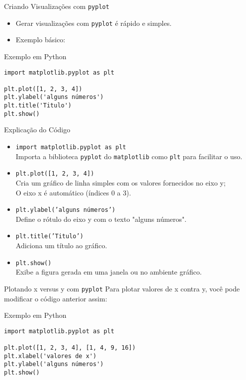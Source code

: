 \begin{frame}[fragile]{Criando Visualizações com \texttt{pyplot}}
    \begin{itemize}
        \item Gerar visualizações com \texttt{pyplot} é rápido e simples.
        \item Exemplo básico:
    \end{itemize}

    \begin{block}{Exemplo em Python}
        \begin{verbatim}
import matplotlib.pyplot as plt

plt.plot([1, 2, 3, 4])
plt.ylabel('alguns números')
plt.title('Titulo')
plt.show()
    \end{verbatim}
    \end{block}
\end{frame}

\begin{frame}{Explicação do Código}
    \begin{itemize}
        \item \texttt{import matplotlib.pyplot as plt} \\
              Importa a biblioteca \texttt{pyplot} do \texttt{matplotlib}  como \texttt{plt} para facilitar o uso.
        \item \texttt{plt.plot([1, 2, 3, 4])} \\
              Cria um gráfico de linha simples com os valores fornecidos no eixo y;\\ O eixo x é automático (índices 0 a 3).
        \item \texttt{plt.ylabel('alguns números')} \\
              Define o rótulo do eixo y com o texto "alguns números".
        \item \texttt{plt.title('Titulo')} \\
              Adiciona um título ao gráfico.
        \item \texttt{plt.show()} \\
              Exibe a figura gerada em uma janela ou no ambiente gráfico.
    \end{itemize}
\end{frame}


\begin{frame}[fragile]{Plotando x versus y com \texttt{pyplot}}
    Para plotar valores de x contra y, você pode modificar o código anterior assim:

    \begin{block}{Exemplo em Python}
        \begin{verbatim}
import matplotlib.pyplot as plt

plt.plot([1, 2, 3, 4], [1, 4, 9, 16])
plt.xlabel('valores de x')
plt.ylabel('alguns números')
plt.show()
\end{verbatim}
    \end{block}
\end{frame}

